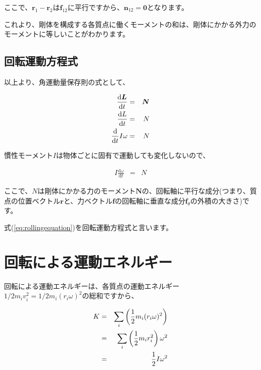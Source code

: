 ここで、$\bm{r}_1-\bm{r}_2$は$\bm{f}_{12}$に平行ですから、$\bm{n}_{12}=\bm{0}$となります。

これより、剛体を構成する各質点に働くモーメントの和は、剛体にかかる外力のモーメントに等しいことがわかります。

\subsection{回転運動方程式}

以上より、角運動量保存則の式として、

\begin{eqnarray}
    \frac{\mathrm{d}\bm{L}}{\mathrm{d}t}&=&\bm{N} \notag \\
    \frac{\mathrm{d}L}{\mathrm{d}t}&=&N \notag \\
    \frac{\mathrm{d}}{\mathrm{d}t}I\omega&=&N \notag
\end{eqnarray}

慣性モーメント$I$は物体ごとに固有で運動しても変化しないので、

\begin{eqnarray}
    I\frac{\mathrm{d}\omega}{\mathrm{d}t}&=&N
    \label{eq:rollingequation}
\end{eqnarray}

ここで、$N$は剛体にかかる力のモーメント$\bm{N}$の、回転軸に平行な成分(つまり、質点の位置ベクトル$\bm{r}$と、力ベクトル$\bm{f}$の回転軸に垂直な成分$\bm{f}_\theta$の外積の大きさ)です。

式(\ref{eq:rollingequation})を回転運動方程式と言います。

\section{回転による運動エネルギー}
回転による運動エネルギーは、各質点の運動エネルギー$1/2m_iv_i^2=1/2m_i(r_i\omega)^2$の総和ですから、

\begin{eqnarray}
    K&=&\sum_i\left(\frac{1}{2}m_i(r_i\omega)^2\right) \notag \\
    &=&\sum_i\left(\frac{1}{2}m_ir_i^2\right)\omega^2 \notag \\
    &=&\frac{1}{2}I\omega^2
\end{eqnarray}